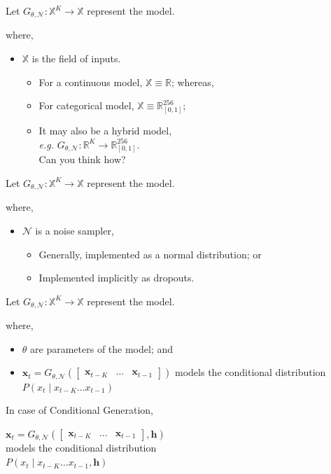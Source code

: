 \documentclass[12pt]{tiet-question-paper}
\begin{document}
{\huge

Let \(G_{\theta,\mathcal{N}} : \mathbb{X}^K \to
\mathbb{X}\) represent the model.

where,
\begin{itemize}
\item \(\mathbb{X}\) is the field of inputs.
\begin{itemize}
\item For a continuous model, \(\mathbb{X}\equiv
    \mathbb{R}\); whereas,
\item For categorical model,
\(\mathbb{X}\equiv\mathbb{R}_{[0,1]}^{256}\);
\item It may also be a hybrid model, \\[0pt]
\emph{e.g.} \(G_{\theta,\mathcal{N}} : \mathbb{R}^K \to
    \mathbb{R}_{[0,1]}^{256}\). \\[0pt]
Can you think how?
\end{itemize}
\end{itemize}

Let \(G_{\theta,\mathcal{N}} : \mathbb{X}^K \to
\mathbb{X}\) represent the model.

where,
\begin{itemize}
\item \(\mathcal{N}\) is a noise sampler,
\begin{itemize}
\item Generally, implemented as a normal distribution; or
\item Implemented implicitly as dropouts.
\end{itemize}
\end{itemize}

Let \(G_{\theta,\mathcal{N}} : \mathbb{X}^K \to
\mathbb{X}\) represent the model.

where,
\begin{itemize}
\item \(\theta\) are parameters of the model; and
\item \(\mathbf{x}_{t} = G_{\theta,\mathcal{N}}
  \left( \begin{bmatrix} \mathbf{x}_{t-K} & \ldots &
  \mathbf{x}_{t-1} \end{bmatrix} \right)\) models the
conditional distribution \(P(x_t \mid x_{t-K}\ldots
  x_{t-1})\)
\end{itemize}

\newpage

In case of Conditional Generation,

\(\mathbf{x}_{t} = G_{\theta,\mathcal{N}}
\left( \begin{bmatrix} \mathbf{x}_{t-K} & \ldots &
\mathbf{x}_{t-1} \end{bmatrix}, \mathbf{h} \right)\) \\[0pt]
models the conditional distribution \\[0pt]
\(P(x_t \mid x_{t-K}\ldots x_{t-1}, \mathbf{h})\)

}
\end{document}
